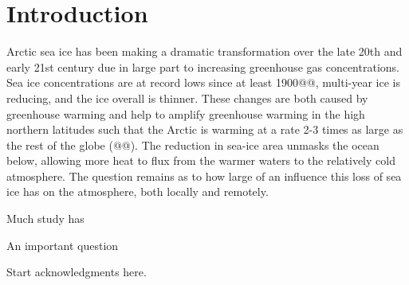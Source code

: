 \documentclass[twocol]{ametsoc}
\begin{document}

\section{Introduction}

Arctic sea ice has been making a dramatic transformation over the late 20th and early 21st century due in large part to increasing greenhouse gas concentrations. Sea ice concentrations are at record lows since at least 1900@@, multi-year ice is reducing, and the ice overall is thinner. These changes are both caused by greenhouse warming and help to amplify greenhouse warming in the high northern latitudes such that the Arctic is warming at a rate 2-3 times as large as the rest of the globe (@@). The reduction in sea-ice area unmasks the ocean below, allowing more heat to flux from the warmer waters to the relatively cold atmosphere. The question remains as to how large of an influence this loss of sea ice has on the atmosphere, both locally and remotely.

Much study has 

An important question

%
\acknowledgments
Start acknowledgments here.

%



\end{document}
